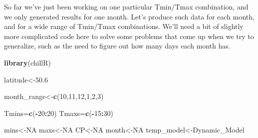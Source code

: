 \documentclass[
]{book}
\newenvironment{Shaded}{\begin{snugshade}}{\end{snugshade}}
\newcommand{\DecValTok}[1]{\textcolor[rgb]{0.00,0.00,0.81}{#1}}
\newcommand{\FloatTok}[1]{\textcolor[rgb]{0.00,0.00,0.81}{#1}}
\newcommand{\KeywordTok}[1]{\textcolor[rgb]{0.13,0.29,0.53}{\textbf{#1}}}
\newcommand{\NormalTok}[1]{#1}
\newcommand{\OperatorTok}[1]{\textcolor[rgb]{0.81,0.36,0.00}{\textbf{#1}}}
\newcommand{\OtherTok}[1]{\textcolor[rgb]{0.56,0.35,0.01}{#1}}
\begin{document}
So far we've just been working on one particular Tmin/Tmax combination, and we only generated results for one month. Let's produce such data for each month, and for a wide range of Tmin/Tmax combinations. We'll need a bit of slightly more complicated code here to solve some problems that come up when we try to generalize, such as the need to figure out how many days each month has.

\begin{Shaded}
\begin{Highlighting}[]
\KeywordTok{library}\NormalTok{(chillR)}

\NormalTok{latitude<-}\FloatTok{50.6}

\NormalTok{month_range<-}\KeywordTok{c}\NormalTok{(}\DecValTok{10}\NormalTok{,}\DecValTok{11}\NormalTok{,}\DecValTok{12}\NormalTok{,}\DecValTok{1}\NormalTok{,}\DecValTok{2}\NormalTok{,}\DecValTok{3}\NormalTok{)}

\NormalTok{Tmins=}\KeywordTok{c}\NormalTok{(}\OperatorTok{-}\DecValTok{20}\OperatorTok{:}\DecValTok{20}\NormalTok{)}
\NormalTok{Tmaxs=}\KeywordTok{c}\NormalTok{(}\OperatorTok{-}\DecValTok{15}\OperatorTok{:}\DecValTok{30}\NormalTok{)}

\NormalTok{mins<-}\OtherTok{NA}
\NormalTok{maxs<-}\OtherTok{NA}
\NormalTok{CP<-}\OtherTok{NA}
\NormalTok{month<-}\OtherTok{NA}
\NormalTok{temp_model<-Dynamic_Model}


\end{Highlighting}
\end{Shaded}
\end{document}

